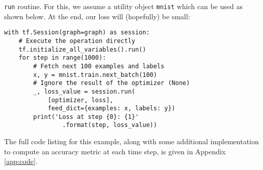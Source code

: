 \texttt{run} routine. For this, we assume a utility object \texttt{mnist} which
can be used as shown below. At the end, our loss will (hopefully) be small:
%
\begin{lstlisting}
with tf.Session(graph=graph) as session:
    # Execute the operation directly
    tf.initialize_all_variables().run()
    for step in range(1000):
        # Fetch next 100 examples and labels
        x, y = mnist.train.next_batch(100)
        # Ignore the result of the optimizer (None)
        _, loss_value = session.run(
            [optimizer, loss],
            feed_dict={examples: x, labels: y})
        print('Loss at step {0}: {1}'
                .format(step, loss_value))
\end{lstlisting}
%
The full code listing for this example, along with some additional
implementation to compute an accuracy metric at each time step, is given in
Appendix \ref{app:code}.

